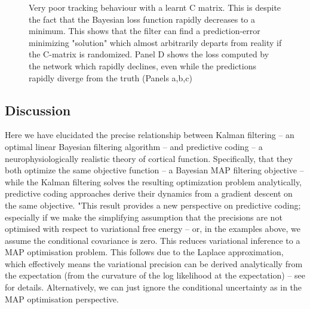 \begin{figure}
 \caption{Very poor tracking behaviour with a learnt C matrix. This is despite the fact that the Bayesian loss function rapidly decreases to a minimum. This shows that the filter can find a prediction-error minimizing "solution" which almost arbitrarily departs from reality if the C-matrix is randomized. Panel D shows the loss computed by the network which rapidly declines, even while the predictions rapidly diverge from the truth (Panels a,b,c)}
 
\label{KF_learn_C_figure}
\end{figure}

\subsection{Discussion}

Here we have elucidated the precise relationship between Kalman filtering -- an optimal linear Bayesian filtering algorithm -- and predictive coding -- a neurophysiologically realistic theory of cortical function. Specifically, that they both optimize the same objective function -- a Bayesian MAP filtering objective -- while the Kalman filtering solves the resulting optimization problem analytically, predictive coding approaches derive their dynamics from a gradient descent on the same objective. "This result provides a new perspective on predictive coding; especially if we make the simplifying assumption that the precisions are not optimised with respect to variational free energy – or, in the examples above, we assume the conditional covariance is zero. This reduces variational inference to a MAP optimisation problem. This follows due to the Laplace approximation, which effectively means the variational precision can be derived analytically from the expectation (from the curvature of the log likelihood at the expectation) – see \citep{friston2007free} for details. Alternatively, we can just ignore the conditional uncertainty as in the MAP optimisation perspective.



